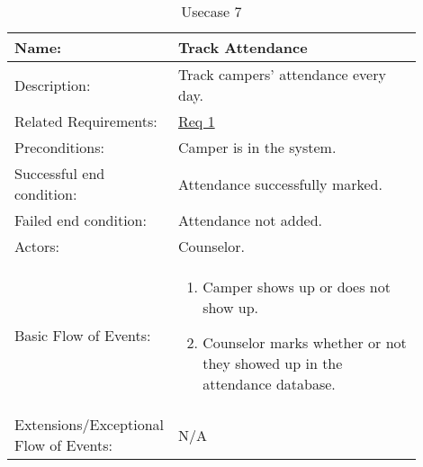 \documentclass[11pt]{article}
\begin{document}

\begin{table}[!htb]
\caption{Usecase 7}
\label{des:track attendance}
\begin{center}
\begin{tabular}{p{0.30\linewidth}p{0.60\linewidth}}
	Name: & Track Attendance\\\hline
	Description: & Track campers' attendance every day.\\\hline
	Related Requirements:& \hyperlink{Req1}{Req 1}\\\hline
	Preconditions:& Camper is in the system.\\\hline
	Successful end condition:& Attendance successfully marked. \\\hline
	Failed end condition:& Attendance not added.\\\hline
	Actors:& Counselor. \\\hline
	Basic Flow of Events: & \begin{enumerate}[topsep=0pt]
		\item Camper shows up or does not show up.
		\item Counselor marks whether or not they showed up in the attendance database.
	\end{enumerate}\\\hline
	Extensions/Exceptional Flow of Events: & \vspace*{.25em}  N/A
\end{tabular}
\end{center}
\end{table}
\end{document}
